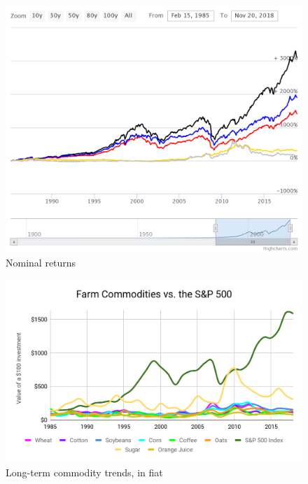 \documentclass{article}
\begin{document}
\vspace{10pt}

\begin{figure}[!htb]
    \centering
    \includegraphics[width=450pt]{imgs/17.png}
    \caption{Nominal returns}
\end{figure}

\vspace{10pt}

\begin{figure}[!htb]
    \centering
    \includegraphics[width=\textwidth]{imgs/18.png}
    \caption{Long-term commodity trends, in fiat}
\end{figure}

\vspace{10pt}
\end{document}
